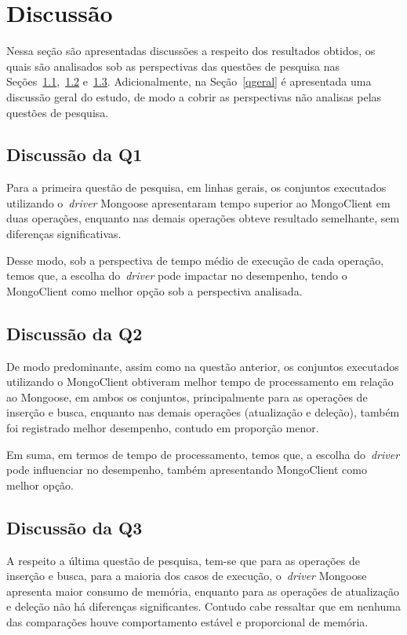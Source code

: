 \documentclass[12pt]{article}
\begin{document}
\section{Discussão}
\label{section:discussao}

Nessa seção são apresentadas discussões a respeito dos resultados obtidos, os quais são analisados sob as perspectivas das questões de pesquisa nas Seções~\ref{q1},~\ref{q2} e~\ref{q3}.
Adicionalmente, na Seção~\ref{qgeral} é apresentada uma discussão geral do estudo, de modo a cobrir as perspectivas não analisas pelas questões de pesquisa.

\subsection{Discussão da Q1}
\label{q1}

Para a primeira questão de pesquisa, em linhas gerais, os conjuntos executados utilizando o~\emph{driver} Mongoose apresentaram tempo superior ao MongoClient em duas operações, enquanto nas demais operações obteve resultado semelhante, sem diferenças significativas.

Desse modo, sob a perspectiva de tempo médio de execução de cada operação, temos que, a escolha do~\emph{driver} pode impactar no desempenho, tendo o MongoClient como melhor opção sob a perspectiva analisada.

\subsection{Discussão da Q2}
\label{q2}

De modo predominante, assim como na questão anterior, os conjuntos executados utilizando o MongoClient obtiveram melhor tempo de processamento em relação ao Mongoose, em ambos os conjuntos, principalmente para as operações de inserção e busca, enquanto nas demais operações (atualização e deleção), também foi registrado melhor desempenho, contudo em proporção menor.

Em suma, em termos de tempo de processamento, temos que, a escolha do~\emph{driver} pode influenciar no desempenho, também apresentando MongoClient como melhor opção.

\subsection{Discussão da Q3}
\label{q3}

A respeito a última questão de pesquisa, tem-se que para as operações de inserção e busca, para a maioria dos casos de execução, o~\emph{driver} Mongoose apresenta maior consumo de memória, enquanto para as operações de atualização e deleção não há diferenças significantes.
Contudo cabe ressaltar que em nenhuma das comparações houve comportamento estável e proporcional de memória.
\end{document}

